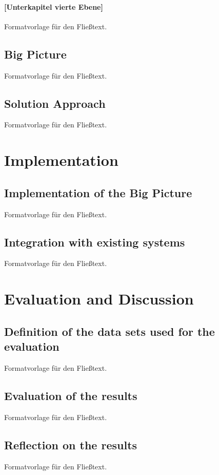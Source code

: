 \documentclass[a4paper,12pt,twoside]{scrreprt}
\begin{document}
\subsubsection{[Unterkapitel vierte Ebene]}
Formatvorlage für den Fließtext.

\section{Big Picture}
Formatvorlage für den Fließtext.

\section{Solution Approach}
Formatvorlage für den Fließtext.


\chapter{Implementation}

\section{Implementation of the Big Picture}
Formatvorlage für den Fließtext.

\section{Integration with existing systems}
Formatvorlage für den Fließtext.


\chapter{Evaluation and Discussion}

\section{Definition of the data sets used for the evaluation}
Formatvorlage für den Fließtext.

\section{Evaluation of the results}
Formatvorlage für den Fließtext.

\section{Reflection on the results}
Formatvorlage für den Fließtext.
\end{document}
